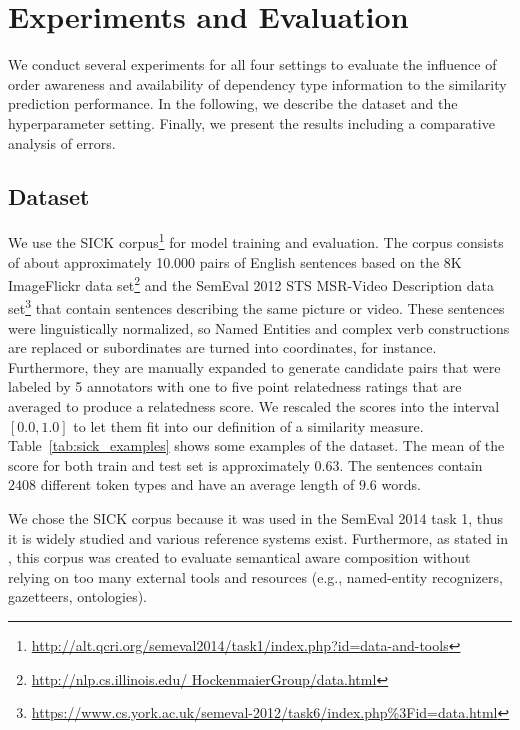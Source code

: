 \section{Experiments and Evaluation}
We conduct several experiments for all four settings to evaluate the influence of order awareness and availability of dependency type information to the similarity prediction performance. In the following, we describe the dataset and the hyperparameter setting. Finally, we present the results including a comparative analysis of errors.

\subsection{Dataset}
We use the SICK corpus\footnote{\url{http://alt.qcri.org/semeval2014/task1/index.php?id=data-and-tools}} \autocite{marelli_sick_2014} for model training and evaluation. The corpus consists of about approximately 10.000 pairs of English sentences based on the 8K ImageFlickr data set\footnote{\url{http://nlp.cs.illinois.edu/
HockenmaierGroup/data.html}} \autocite{hodosh_framing_2013} and the SemEval 2012 STS MSR-Video Description data set\footnote{\url{https://www.cs.york.ac.uk/semeval-2012/task6/index.php\%3Fid=data.html}} \autocite{agirre_semeval-2012_2012} that contain sentences describing the same picture or video. These sentences were linguistically normalized, so Named Entities and complex verb constructions are replaced or subordinates are turned into coordinates, for instance. Furthermore, they are manually expanded to generate candidate pairs that were labeled by 5 annotators with one to five point relatedness ratings that are averaged to produce a relatedness score. We rescaled the scores into the interval $[0.0, 1.0]$ to let them fit into our definition of a similarity measure. Table~\ref{tab:sick_examples} shows some examples of the dataset. The mean of the score for both train and test set is approximately $0.63$. The sentences contain $2408$ different token types and have an average length of $9.6$ words.  

We chose the SICK corpus because it was used in the SemEval 2014 task 1, thus it is widely studied and various reference systems exist. Furthermore, as stated in \textcite{marelli_semeval-2014_2014}, this corpus was created to evaluate semantical aware composition without relying on too many external tools and resources (e.g., named-entity recognizers, gazetteers, ontologies).

